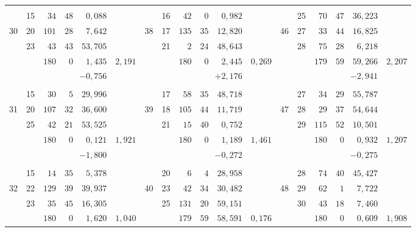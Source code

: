 \begin{center}
\begin{tabular}{|r|r|r@{\;}r@{\;}r|r||r|r|r@{\;}r@{\;}r|r||r|r|r@{\;}r@{\;}r|r|}
 &  &  &  &  &  &  &  &  &  &  &  &  &  &  &  &  & \\
 & 15 & $34$ & $48$ & $0{,}088$ &  &  & 16 & $42$ & $0$ & $0{,}982$ &  &  & 25 & $70$ & $47$ & $36{,}223$ & \\
30 & 20 & $101$ & $28$ & $7{,}642$ &  & 38 & 17 & $135$ & $35$ & $12{,}820$ &  & 46 & 27 & $33$ & $44$ & $16{,}825$ & \\
 & 23 & $43$ & $43$ & $53{,}705$ &  &  & 21 & $2$ & $24$ & $48{,}643$ &  &  & 28 & $75$ & $28$ & $6{,}218$ & \\
\cline{3-5}\cline{9-11}\cline{15-17}
 &  & $180$ & $0$ & $1{,}435$ & $2{,}191$ &  &  & $180$ & $0$ & $2{,}445$ & $0{,}269$ &  &  & $179$ & $59$ & $59{,}266$ & $2{,}207$\\
 &  & \multicolumn{3}{r|}{$-0{,}756$} &  &  &  & \multicolumn{3}{r|}{$+2{,}176$} &  &  &  & \multicolumn{3}{r|}{$-2{,}941$} & \\
 &  &  &  &  &  &  &  &  &  &  &  &  &  &  &  &  & \\
 & 15 & $30$ & $5$ & $29{,}996$ &  &  & 17 & $58$ & $35$ & $48{,}718$ &  &  & 27 & $34$ & $29$ & $55{,}787$ & \\
31 & 20 & $107$ & $32$ & $36{,}600$ &  & 39 & 18 & $105$ & $44$ & $11{,}719$ &  & 47 & 28 & $29$ & $37$ & $54{,}644$ & \\
 & 25 & $42$ & $21$ & $53{,}525$ &  &  & 21 & $15$ & $40$ & $0{,}752$ &  &  & 29 & $115$ & $52$ & $10{,}501$ & \\
\cline{3-5}\cline{9-11}\cline{15-17}
 &  & $180$ & $0$ & $0{,}121$ & $1{,}921$ &  &  & $180$ & $0$ & $1{,}189$ & $1{,}461$ &  &  & $180$ & $0$ & $0{,}932$ & $1{,}207$\\
 &  & \multicolumn{3}{r|}{$-1{,}800$} &  &  &  & \multicolumn{3}{r|}{$-0{,}272$} &  &  &  & \multicolumn{3}{r|}{$-0{,}275$} & \\
 &  &  &  &  &  &  &  &  &  &  &  &  &  &  &  &  & \\
 & 15 & $14$ & $35$ & $5{,}378$ &  &  & 20 & $6$ & $4$ & $28{,}958$ &  &  & 28 & $74$ & $40$ & $45{,}427$ & \\
32 & 22 & $129$ & $39$ & $39{,}937$ &  & 40 & 23 & $42$ & $34$ & $30{,}482$ &  & 48 & 29 & $62$ & $1$ & $7{,}722$ & \\
 & 23 & $35$ & $45$ & $16{,}305$ &  &  & 25 & $131$ & $20$ & $59{,}151$ &  &  & 30 & $43$ & $18$ & $7{,}460$ & \\
\cline{3-5}\cline{9-11}\cline{15-17}
 &  & $180$ & $0$ & $1{,}620$ & $1{,}040$ &  &  & $179$ & $59$ & $58{,}591$ & $0{,}176$ &  &  & $180$ & $0$ & $0{,}609$ & $1\overset{\boldsymbol{\cdot}}{,}908$\\

\end{tabular}
\end{center}
